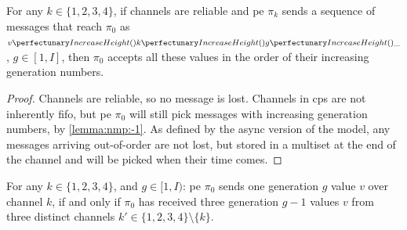 \begin{lemma}\label{lemma:nmp:-2}
    For any $k \in \{ 1, 2, 3, 4 \}$, if channels are reliable and \gls{pe} $\pi_k$ sends a sequence of messages that reach $\pi_0$ as $\cpvv{k}{g}{\cpdiscard}$, $g \in [1,I]$, 
    then $\pi_0$ accepts all these values in the order of their increasing generation numbers.
\end{lemma}

\begin{proof}
    Channels are reliable, so no message is lost. Channels in \gls{cps} are not inherently \gls{fifo}, but \gls{pe} $\pi_0$ will still pick messages with increasing generation numbers, by \cref{lemma:nmp:-1}.
    As defined by the async version of the model, any messages arriving out-of-order are not lost, but stored in a multiset at the end of the channel
    and will be picked when their time comes.
\end{proof}

\begin{lemma}\label{lemma:nmp:-3}
    For any $k \in \{ 1, 2, 3, 4 \}$, and $g \in [1, I)$: \gls{pe} $\pi_0$ sends one generation $g$ value $v$ over channel $k$, if and only if $\pi_0$ has received three generation $g-1$ values $v$ from three distinct channels $k' \in 
    \{ 1, 2, 3, 4 \} \setminus \{ k \}$.
\end{lemma}

